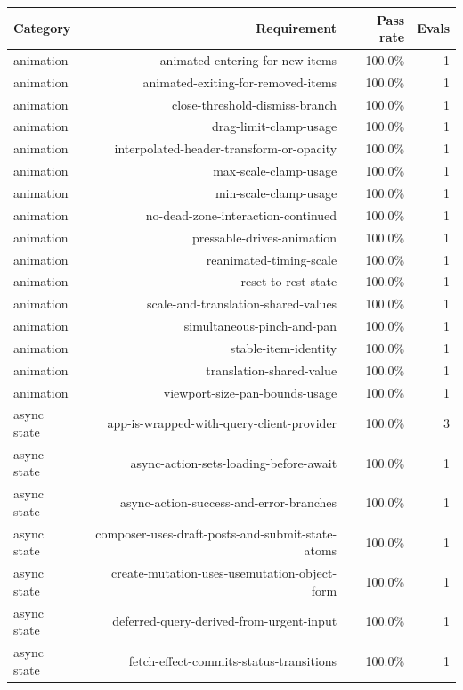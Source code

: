 \begin{table}[htbp]
\centering
\begin{tabular}{lrrr}
\toprule
Category & Requirement & Pass rate & Evals \\
\midrule
animation & animated-entering-for-new-items & 100.0\% & 1 \\
animation & animated-exiting-for-removed-items & 100.0\% & 1 \\
animation & close-threshold-dismiss-branch & 100.0\% & 1 \\
animation & drag-limit-clamp-usage & 100.0\% & 1 \\
animation & interpolated-header-transform-or-opacity & 100.0\% & 1 \\
animation & max-scale-clamp-usage & 100.0\% & 1 \\
animation & min-scale-clamp-usage & 100.0\% & 1 \\
animation & no-dead-zone-interaction-continued & 100.0\% & 1 \\
animation & pressable-drives-animation & 100.0\% & 1 \\
animation & reanimated-timing-scale & 100.0\% & 1 \\
animation & reset-to-rest-state & 100.0\% & 1 \\
animation & scale-and-translation-shared-values & 100.0\% & 1 \\
animation & simultaneous-pinch-and-pan & 100.0\% & 1 \\
animation & stable-item-identity & 100.0\% & 1 \\
animation & translation-shared-value & 100.0\% & 1 \\
animation & viewport-size-pan-bounds-usage & 100.0\% & 1 \\
async state & app-is-wrapped-with-query-client-provider & 100.0\% & 3 \\
async state & async-action-sets-loading-before-await & 100.0\% & 1 \\
async state & async-action-success-and-error-branches & 100.0\% & 1 \\
async state & composer-uses-draft-posts-and-submit-state-atoms & 100.0\% & 1 \\
async state & create-mutation-uses-usemutation-object-form & 100.0\% & 1 \\
async state & deferred-query-derived-from-urgent-input & 100.0\% & 1 \\
async state & fetch-effect-commits-status-transitions & 100.0\% & 1 \\

\end{tabular}
\end{table}
